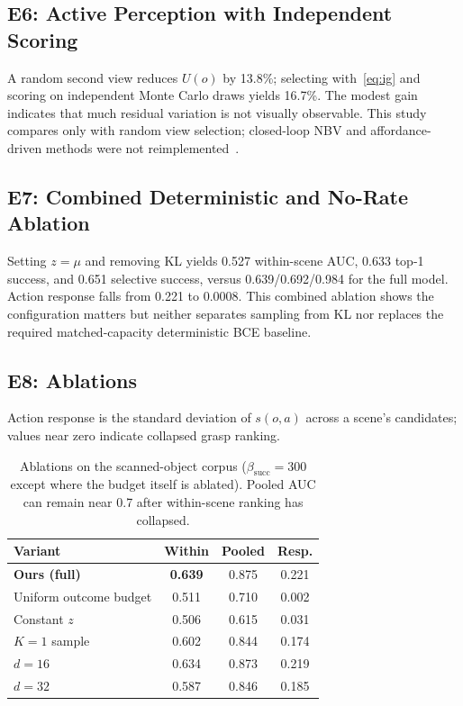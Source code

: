 \documentclass[letterpaper, 10pt, conference]{ieeeconf}
\newcommand{\suff}{\mathrm{succ}}
\begin{document}
\subsection{E6: Active Perception with Independent Scoring}
\label{sec:active-results}
A random second view reduces $U(o)$ by 13.8\%; selecting with~\eqref{eq:ig}
and scoring on independent Monte Carlo draws yields 16.7\%. The modest gain
indicates that much residual variation is not visually observable. This study
compares only with random view selection; closed-loop NBV and affordance-driven
methods were not reimplemented~\cite{breyer2022closed,zhang2023ace}.

\subsection{E7: Combined Deterministic and No-Rate Ablation}
\label{sec:baseline}
Setting $z=\mu$ and removing KL yields 0.527 within-scene AUC, 0.633 top-1
success, and 0.651 selective success, versus 0.639/0.692/0.984 for the full
model. Action response falls from 0.221 to 0.0008. This combined ablation
shows the configuration matters but neither separates sampling from KL nor
replaces the required matched-capacity deterministic BCE baseline.

\subsection{E8: Ablations}
\label{sec:ablations}
Action response is the standard deviation of $s(o,a)$ across a scene's
candidates; values near zero indicate collapsed grasp ranking.

\begin{table}[!t]
\centering
\caption{Ablations on the scanned-object corpus
($\beta_{\suff}=300$ except where the budget itself is ablated). Pooled AUC
can remain near 0.7 after within-scene ranking has collapsed.}
\label{tab:ablations}
\footnotesize
\setlength{\tabcolsep}{3pt}
\begin{tabular}{lccc}
\toprule
Variant & Within & Pooled & Resp. \\
\midrule
\textbf{Ours (full)} & \textbf{0.639} & 0.875 & 0.221 \\
Uniform outcome budget & 0.511 & 0.710 & 0.002 \\
Constant $z$ & 0.506 & 0.615 & 0.031 \\
$K{=}1$ sample & 0.602 & 0.844 & 0.174 \\
$d{=}16$ & 0.634 & 0.873 & 0.219 \\
$d{=}32$ & 0.587 & 0.846 & 0.185 \\
\bottomrule
\end{tabular}
\end{table}
\end{document}
